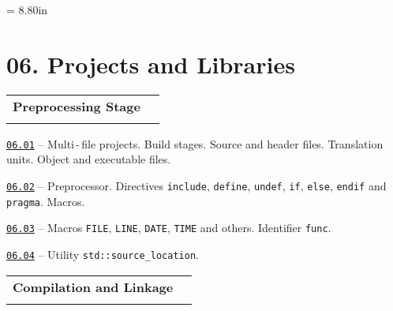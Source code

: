 \documentclass[a4paper,12pt]{article}
\renewenvironment{itemize}
{
    \begin{list}{\labelitemi}
    {
      \setlength{\topsep}{0pt}
      \setlength{\partopsep}{0pt}
      \setlength{\parskip}{0pt}
      \setlength{\itemsep}{0pt}
      \setlength{\parsep}{0pt}
      \setlength{\leftmargin}{14.5pt}
    }
}{\end{list}}
\begin{document}
\newpage\thispagestyle{empty}\pdfpageheight = 8.80in\enlargethispage{100in}

\section{06. Projects and Libraries}

\begin{tabular}{!{\vrule width 1pt}L{4.0cm}!{\vrule width 1pt}L{15.0cm}!{\vrule width 0pt}} 


\textbf{Preprocessing Stage} & \\


\end{tabular}

\medskip\smallskip

\begin{itemize}

    \item \href{https://github.com/i-s-m-mipt/Education/blob/master/projects/examples/source/06.01.pdf}{\texttt{06.01}} -- Multi\,-\,file projects. Build stages. Source and header files. Translation units. Object and executable files.

    \smallskip

    \item \href{https://github.com/i-s-m-mipt/Education/blob/master/projects/examples/source/06.02.cpp}{\texttt{06.02}} -- Preprocessor. Directives \lstinline{include}, \lstinline{define}, \lstinline{undef},  \lstinline{if}, \lstinline{else}, \lstinline{endif} and \lstinline{pragma}. Macros. 

    \smallskip

    \item \href{https://github.com/i-s-m-mipt/Education/blob/master/projects/examples/source/06.03.cpp}{\texttt{06.03}} -- Macros \lstinline{FILE}, \lstinline{LINE}, \lstinline{DATE}, \lstinline{TIME} and others. Identifier \lstinline{func}.

    \smallskip

    \item \href{https://github.com/i-s-m-mipt/Education/blob/master/projects/examples/source/06.04.cpp}{\texttt{06.04}} -- Utility \lstinline{std::source_location}.

\end{itemize}

\bigskip\medskip

\begin{tabular}{!{\vrule width 1pt}L{4.9cm}!{\vrule width 1pt}L{14.1cm}!{\vrule width 0pt}} 


\textbf{Compilation and Linkage} & \\


\end{tabular}
\end{document}
